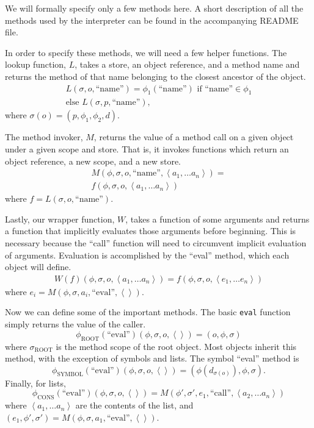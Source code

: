 \documentclass[twocolumn]{article}
\begin{document}
We will formally specify only a few methods here. A short description
of all the methods used by the interpreter can be found in the
accompanying README file.

In order to specify these methods, we will need a few helper
functions. The lookup function, $L$, takes a store, an object
reference, and a method name and returns the method of that name
belonging to the closest ancestor of the object.
\begin{multline*}
  L(\sigma,o,\text{``name''}) = \phi_1(\text{``name''}) \text{ if
  ``name''} \in \phi_1 \\\text{else }L(\sigma,p,\text{``name''}),
\end{multline*}
where $\sigma(o)=(p,\phi_1,\phi_2,d)$.

The method invoker, $M$, returns the value of a method call on a given
object under a given scope and store. That is, it invokes functions
which return an object reference, a new scope, and a new store.
\begin{multline*} M(\phi,\sigma,o,\text{``name''},\left<a_1,\ldots a_n\right>)
 =\\ f( \phi, \sigma, o, \left<a_1, \ldots a_n\right> )
\end{multline*}
where $f = L(\sigma,o,\text{``name''})$.

Lastly, our wrapper function, $W$, takes a function of some arguments
and returns a function that implicitly evaluates those arguments
before beginning. This is necessary because the ``call'' function will
need to circumvent implicit evaluation of arguments. Evaluation is
accomplished by the ``eval'' method, which each object will define.
\begin{multline*}
W(f)(\phi,\sigma,o,\left<a_1,\ldots a_n\right>) =
f(\phi,\sigma,o,\left<e_1,\ldots e_n\right>)
\end{multline*}
where $e_i = M(\phi,\sigma,a_i,\text{``eval''},\left<\right>)$.

Now we can define some of the important methods. The basic
\texttt{eval} function simply returns the value of the caller.
\[ \phi_{\text{ROOT}}(\text{``eval''})(\phi,\sigma,o,\left<\right>) = 
(o,\phi,\sigma) \]
where $\sigma_{\text{ROOT}}$ is the method scope of the root
object. Most objects inherit this method, with the exception of
symbols and lists. The symbol ``eval'' method is
\[ \phi_{\text{SYMBOL}}(\text{``eval''})(\phi,\sigma,o,\left<\right>) = 
(\phi(d_{\sigma(o)}),\phi,\sigma). \]
Finally, for lists,
\[ \phi_{\text{CONS}}(\text{``eval''})(\phi,\sigma,o,\left<\right>) =
M(\phi',\sigma',e_1,\text{``call''},\left<a_2,\ldots a_n\right>) \]
where $\left< a_1,\ldots a_n\right>$ are the contents of the list, and
$(e_1,\phi',\sigma') = M(\phi,\sigma,a_1,\text{``eval''},\left<\right>)$.
\end{document}
